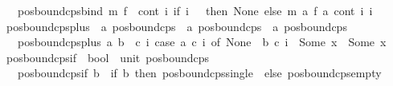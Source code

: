 \begin{isabellebody}
\ \ \ {\isachardoublequoteopen}pos{\isacharunderscore}{\kern0pt}bound{\isacharunderscore}{\kern0pt}cps{\isacharunderscore}{\kern0pt}bind\ m\ f\ {\isacharequal}{\kern0pt}\ {\isacharparenleft}{\kern0pt}{\isasymlambda}cont\ i{\isachardot}{\kern0pt}\ if\ i\ {\isacharequal}{\kern0pt}\ {}\ then\ None\ else\ {\isacharparenleft}{\kern0pt}m\ {\isacharparenleft}{\kern0pt}{\isasymlambda}a{\isachardot}{\kern0pt}\ {\isacharparenleft}{\kern0pt}f\ a{\isacharparenright}{\kern0pt}\ cont\ i{\isacharparenright}{\kern0pt}\ {\isacharparenleft}{\kern0pt}i\ {\isacharminus}{\kern0pt}\ {}{\isacharparenright}{\kern0pt}{\isacharparenright}{\kern0pt}{\isacharparenright}{\kern0pt}{\isachardoublequoteclose}\isanewline
\isanewline
{}\isamarkupfalse%
\ pos{\isacharunderscore}{\kern0pt}bound{\isacharunderscore}{\kern0pt}cps{\isacharunderscore}{\kern0pt}plus\ {\isacharcolon}{\kern0pt}{\isacharcolon}{\kern0pt}\ {\isachardoublequoteopen}{\isacharprime}{\kern0pt}a\ pos{\isacharunderscore}{\kern0pt}bound{\isacharunderscore}{\kern0pt}cps\ {\isasymRightarrow}\ {\isacharprime}{\kern0pt}a\ pos{\isacharunderscore}{\kern0pt}bound{\isacharunderscore}{\kern0pt}cps\ {\isasymRightarrow}\ {\isacharprime}{\kern0pt}a\ pos{\isacharunderscore}{\kern0pt}bound{\isacharunderscore}{\kern0pt}cps{\isachardoublequoteclose}\isanewline
\ \ \ {\isachardoublequoteopen}pos{\isacharunderscore}{\kern0pt}bound{\isacharunderscore}{\kern0pt}cps{\isacharunderscore}{\kern0pt}plus\ a\ b\ {\isacharequal}{\kern0pt}\ {\isacharparenleft}{\kern0pt}{\isasymlambda}c\ i{\isachardot}{\kern0pt}\ case\ a\ c\ i\ of\ None\ {\isasymRightarrow}\ b\ c\ i\ {\isacharbar}{\kern0pt}\ Some\ x\ {\isasymRightarrow}\ Some\ x{\isacharparenright}{\kern0pt}{\isachardoublequoteclose}\isanewline
\isanewline
{}\isamarkupfalse%
\ pos{\isacharunderscore}{\kern0pt}bound{\isacharunderscore}{\kern0pt}cps{\isacharunderscore}{\kern0pt}if\ {\isacharcolon}{\kern0pt}{\isacharcolon}{\kern0pt}\ {\isachardoublequoteopen}bool\ {\isasymRightarrow}\ unit\ pos{\isacharunderscore}{\kern0pt}bound{\isacharunderscore}{\kern0pt}cps{\isachardoublequoteclose}\isanewline
\ \ \ {\isachardoublequoteopen}pos{\isacharunderscore}{\kern0pt}bound{\isacharunderscore}{\kern0pt}cps{\isacharunderscore}{\kern0pt}if\ b\ {\isacharequal}{\kern0pt}\ {\isacharparenleft}{\kern0pt}if\ b\ then\ pos{\isacharunderscore}{\kern0pt}bound{\isacharunderscore}{\kern0pt}cps{\isacharunderscore}{\kern0pt}single\ {\isacharparenleft}{\kern0pt}{\isacharparenright}{\kern0pt}\ else\ pos{\isacharunderscore}{\kern0pt}bound{\isacharunderscore}{\kern0pt}cps{\isacharunderscore}{\kern0pt}empty{\isacharparenright}{\kern0pt}{\isachardoublequoteclose}\isanewline

\end{isabellebody}
